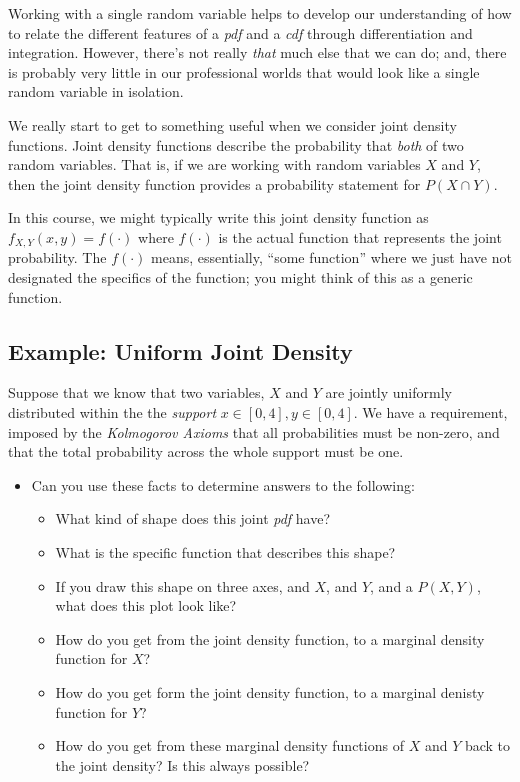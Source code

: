 \documentclass[
]{book}
\providecommand{\tightlist}{%
  \setlength{\itemsep}{0pt}\setlength{\parskip}{0pt}}
\theoremstyle{definition}
\theoremstyle{definition}
\theoremstyle{definition}
\theoremstyle{definition}
\theoremstyle{remark}
\begin{document}
Working with a single random variable helps to develop our understanding of how to relate the different features of a \emph{pdf} and a \emph{cdf} through differentiation and integration. However, there's not really \emph{that} much else that we can do; and, there is probably very little in our professional worlds that would look like a single random variable in isolation.

We really start to get to something useful when we consider joint density functions. Joint density functions describe the probability that \emph{both} of two random variables. That is, if we are working with random variables \(X\) and \(Y\), then the joint density function provides a probability statement for \(P(X \cap Y)\).

In this course, we might typically write this joint density function as \(f_{X,Y}(x,y) = f(\cdot)\) where \(f(\cdot)\) is the actual function that represents the joint probability. The \(f(\cdot)\) means, essentially, ``some function'' where we just have not designated the specifics of the function; you might think of this as a generic function.

\hypertarget{example-uniform-joint-density}{%
\subsection{Example: Uniform Joint Density}\label{example-uniform-joint-density}}

Suppose that we know that two variables, \(X\) and \(Y\) are jointly uniformly distributed within the the \emph{support} \(x \in [0,4], y \in [0,4]\). We have a requirement, imposed by the \emph{Kolmogorov Axioms} that all probabilities must be non-zero, and that the total probability across the whole support must be one.

\begin{itemize}
\tightlist
\item
  Can you use these facts to determine answers to the following:

  \begin{itemize}
  \tightlist
  \item
    What kind of shape does this joint \emph{pdf} have?
  \item
    What is the specific function that describes this shape?
  \item
    If you draw this shape on three axes, and \(X\), and \(Y\), and a \(P(X,Y)\), what does this plot look like?
  \item
    How do you get from the joint density function, to a marginal density function for \(X\)?
  \item
    How do you get form the joint density function, to a marginal denisty function for \(Y\)?
  \item
    How do you get from these marginal density functions of \(X\) and \(Y\) back to the joint density? Is this always possible?
  \end{itemize}
\end{itemize}
\end{document}
